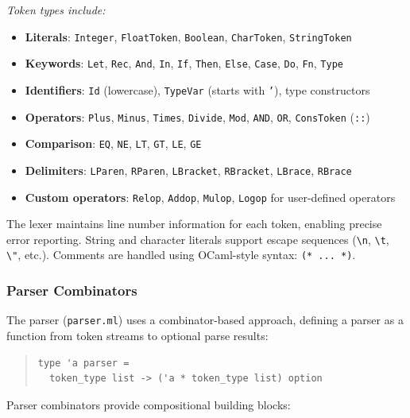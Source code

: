 \documentclass[conference,onecolumn]{IEEEtran}
\begin{document}
\textit{Token types include:}
\begin{itemize}
\item \textbf{Literals}: \texttt{Integer}, \texttt{FloatToken}, \texttt{Boolean}, \texttt{CharToken}, \texttt{StringToken}
\item \textbf{Keywords}: \texttt{Let}, \texttt{Rec}, \texttt{And}, \texttt{In}, \texttt{If}, \texttt{Then}, \texttt{Else}, \texttt{Case}, \texttt{Do}, \texttt{Fn}, \texttt{Type}
\item \textbf{Identifiers}: \texttt{Id} (lowercase), \texttt{TypeVar} (starts with \texttt{'}), type constructors
\item \textbf{Operators}: \texttt{Plus}, \texttt{Minus}, \texttt{Times}, \texttt{Divide}, \texttt{Mod}, \texttt{AND}, \texttt{OR}, \texttt{ConsToken} (\texttt{::})
\item \textbf{Comparison}: \texttt{EQ}, \texttt{NE}, \texttt{LT}, \texttt{GT}, \texttt{LE}, \texttt{GE}
\item \textbf{Delimiters}: \texttt{LParen}, \texttt{RParen}, \texttt{LBracket}, \texttt{RBracket}, \texttt{LBrace}, \texttt{RBrace}
\item \textbf{Custom operators}: \texttt{Relop}, \texttt{Addop}, \texttt{Mulop}, \texttt{Logop} for user-defined operators
\end{itemize}

The lexer maintains line number information for each token, enabling precise error reporting. String and character literals support escape sequences (\texttt{\textbackslash n}, \texttt{\textbackslash t}, \texttt{\textbackslash"}, etc.). Comments are handled using OCaml-style syntax: \texttt{(* ... *)}.

\subsubsection{Parser Combinators}

The parser (\texttt{parser.ml}) uses a combinator-based approach, defining a parser as a function from token streams to optional parse results:

\begin{quote}
\small
\begin{verbatim}
type 'a parser = 
  token_type list -> ('a * token_type list) option
\end{verbatim}
\end{quote}

Parser combinators provide compositional building blocks:
\end{document}

